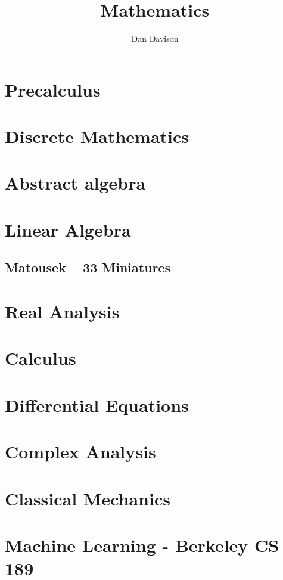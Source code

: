 \documentclass{book}
\title{Mathematics}
\author{Dan Davison}
\begin{document}
\frontmatter
\maketitle
\tableofcontents
\mainmatter


\chapter{Precalculus}


\chapter{Discrete Mathematics}


\chapter{Abstract algebra}


\chapter{Linear Algebra}

\section{Matousek -- 33 Miniatures}


\chapter{Real Analysis}


\chapter{Calculus}



\chapter{Differential Equations}


\chapter{Complex Analysis}


\chapter{Classical Mechanics}


\chapter{Machine Learning - Berkeley CS 189}


\end{document}
